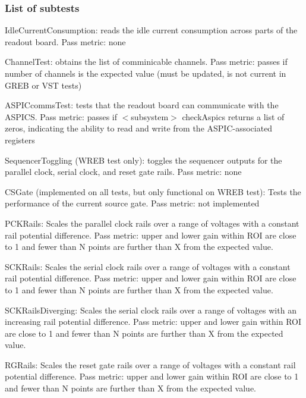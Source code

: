 \subsubsection*{List of subtests}


\begin{DoxyItemize}
\item {\ttfamily Idle\+Current\+Consumption}\+: reads the idle current consumption across parts of the readout board. Pass metric\+: none
\item {\ttfamily Channel\+Test}\+: obtains the list of comminicable channels. Pass metric\+: passes if number of channels is the expected value (must be updated, is not current in G\+R\+EB or V\+ST tests)
\item {\ttfamily A\+S\+P\+I\+Ccomms\+Test}\+: tests that the readout board can communicate with the A\+S\+P\+I\+CS. Pass metric\+: passes if {\ttfamily $<$subsystem$>$ check\+Aspics} returns a list of zeros, indicating the ability to read and write from the A\+S\+P\+I\+C-\/associated registers
\item {\ttfamily Sequencer\+Toggling} (W\+R\+EB test only)\+: toggles the sequencer outputs for the parallel clock, serial clock, and reset gate rails. Pass metric\+: none
\item {\ttfamily C\+S\+Gate} (implemented on all tests, but only functional on W\+R\+EB test)\+: Tests the performance of the current source gate. Pass metric\+: not implemented
\item {\ttfamily P\+C\+K\+Rails}\+: Scales the parallel clock rails over a range of voltages with a constant rail potential difference. Pass metric\+: upper and lower gain within R\+OI are close to 1 and fewer than N points are further than X from the expected value.
\item {\ttfamily S\+C\+K\+Rails}\+: Scales the serial clock rails over a range of voltages with a constant rail potential difference. Pass metric\+: upper and lower gain within R\+OI are close to 1 and fewer than N points are further than X from the expected value.
\item {\ttfamily S\+C\+K\+Rails\+Diverging}\+: Scales the serial clock rails over a range of voltages with an increasing rail potential difference. Pass metric\+: upper and lower gain within R\+OI are close to 1 and fewer than N points are further than X from the expected value.
\item {\ttfamily R\+G\+Rails}\+: Scales the reset gate rails over a range of voltages with a constant rail potential difference. Pass metric\+: upper and lower gain within R\+OI are close to 1 and fewer than N points are further than X from the expected value.

\end{DoxyItemize}

